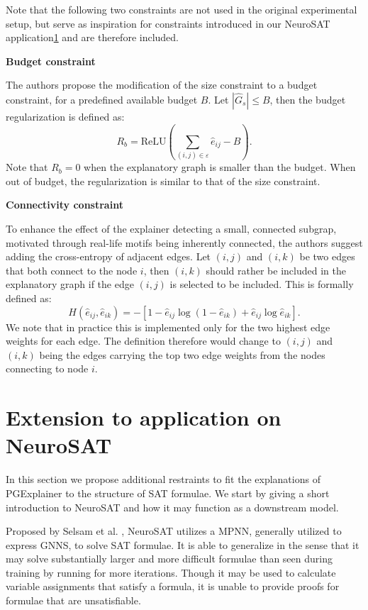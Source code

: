 Note that the following two constraints are not used in the original experimental setup, but serve as inspiration for constraints introduced in our NeuroSAT application\ref{} and are therefore included. \bigskip

\textbf{Budget constraint}

The authors propose the modification of the size constraint to a budget constraint, for a predefined available budget $B$. Let $|\hat{G}_s| \leq B$, then the budget regularization is defined as:
\begin{equation}
    R_b = \text{ReLU}(\sum_{(i,j)\in \varepsilon}\hat{e}_{ij}-B).
\end{equation}
Note that $R_b = 0$ when the explanatory graph is smaller than the budget. When out of budget, the regularization is similar to that of the size constraint. \bigskip

\textbf{Connectivity constraint}

To enhance the effect of the explainer detecting a small, connected subgrap, motivated through real-life motifs being inherently connected, the authors suggest adding the cross-entropy of adjacent edges. Let $(i,j)$ and $(i,k)$ be two edges that both connect to the node $i$, then $(i,k)$ should rather be included in the explanatory graph if the edge $(i,j)$ is selected to be included. This is formally defined as:
\begin{equation}
    H(\hat{e}_{ij},\hat{e}_{ik}) = -[1-\hat{e}_{ij}\log(1-\hat{e}_{ik})+\hat{e}_{ij}\log \hat{e}_{ik}].
\end{equation}
We note that in practice this is implemented only for the two highest edge weights for each edge. The definition therefore would change to $(i,j)$ and $(i,k)$ being the edges carrying the top two edge weights from the nodes connecting to node $i$.


\section{Extension to application on NeuroSAT}
In this section we propose additional restraints to fit the explanations of PGExplainer to the structure of SAT formulae. We start by giving a short introduction to NeuroSAT\cite{selsam2018learning} and how it may function as a downstream model.

 \bigskip
Proposed by Selsam et al. \cite{selsam2018learning}, NeuroSAT utilizes a MPNN, generally utilized to express GNNS, to solve SAT formulae. It is able to generalize in the sense that it may solve substantially larger and more difficult formulae than seen during training by running for more iterations. Though it may be used to calculate variable assignments that satisfy a formula, it is unable to provide proofs for formulae that are unsatisfiable.

